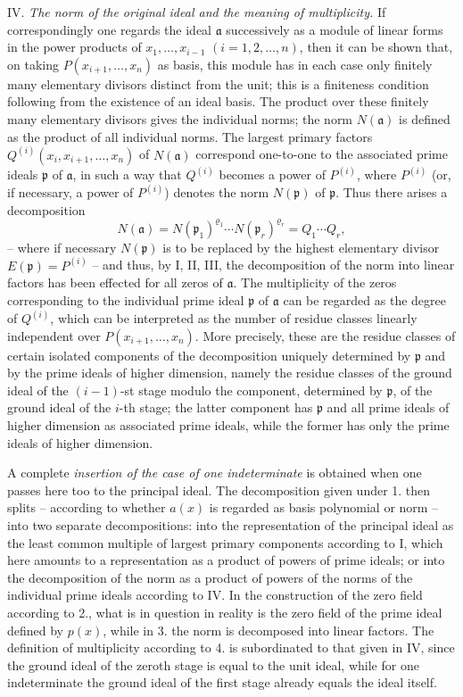 IV. \emph{The norm of the original ideal and the meaning of multiplicity.} If correspondingly one regards the ideal $\mathfrak a$ successively as a module of linear forms in the power products of $x_1,\ldots,x_{i-1}$ $(i=1,2,\ldots,n)$, then it can be shown that, on taking $P(x_{i+1},\ldots,x_n)$ as basis, this module has in each case only finitely many elementary divisors distinct from the unit; this is a finiteness condition following from the existence of an ideal basis. The product over these finitely many elementary divisors gives the individual norms; the norm $N(\mathfrak a)$ is defined as the product of all individual norms. The largest primary factors $Q^{(i)}(x_i,x_{i+1},\ldots,x_n)$ of $N(\mathfrak a)$ correspond one-to-one to the associated prime ideals $\mathfrak p$ of $\mathfrak a$, in such a way that $Q^{(i)}$ becomes a power of $P^{(i)}$, where $P^{(i)}$ (or, if necessary, a power of $P^{(i)}$) denotes the norm $N(\mathfrak p)$ of $\mathfrak p$. Thus there arises a decomposition
\[
 N(\mathfrak a)=N(\mathfrak p_1)^{\varrho_1}\cdots N(\mathfrak p_r)^{\varrho_r}=Q_1\cdots Q_r,
\]
-- where if necessary $N(\mathfrak p)$ is to be replaced by the highest elementary divisor $E(\mathfrak p)=P^{(i)}$ -- and thus, by I, II, III, the decomposition of the norm into linear factors has been effected for all zeros of $\mathfrak a$. The multiplicity of the zeros corresponding to the individual prime ideal $\mathfrak p$ of $\mathfrak a$ can be regarded as the degree of $Q^{(i)}$, which can be interpreted as the number of residue classes linearly independent over $P(x_{i+1},\ldots,x_n)$. More precisely, these are the residue classes of certain isolated components of the decomposition uniquely determined by $\mathfrak p$ and by the prime ideals of higher dimension, namely the residue classes of the ground ideal of the $(i-1)$-st stage modulo the component, determined by $\mathfrak p$, of the ground ideal of the $i$-th stage; the latter component has $\mathfrak p$ and all prime ideals of higher dimension as associated prime ideals, while the former has only the prime ideals of higher dimension.

A complete \emph{insertion of the case of one indeterminate} is obtained when one passes here too to the principal ideal. The decomposition given under 1. then splits -- according to whether $a(x)$ is regarded as basis polynomial or norm -- into two separate decompositions: into the representation of the principal ideal as the least common multiple of largest primary components according to I, which here amounts to a representation as a product of powers of prime ideals; or into the decomposition of the norm as a product of powers of the norms of the individual prime ideals according to IV. In the construction of the zero field according to 2., what is in question in reality is the zero field of the prime ideal defined by $p(x)$, while in 3. the norm is decomposed into linear factors. The definition of multiplicity according to 4. is subordinated to that given in IV, since the ground ideal of the zeroth stage is equal to the unit ideal, while for one indeterminate the ground ideal of the first stage already equals the ideal itself.


